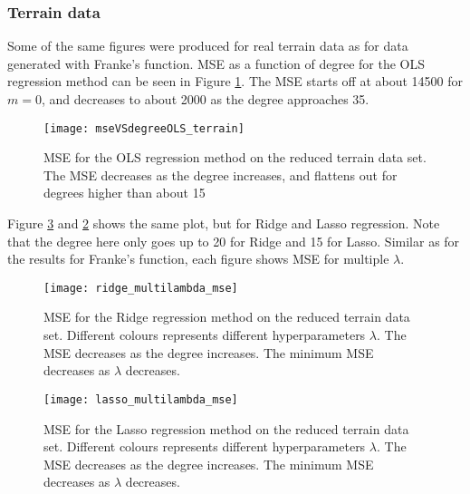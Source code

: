 \subsubsection{Terrain data}
Some of the same figures were produced for real terrain data as for data generated with Franke's function. MSE as a function of degree for the OLS regression method can be seen in Figure \ref{fig:mseVSdegreeOLSterrain}. The MSE starts off at about 14500 for $m=0$, and decreases to about 2000 as the degree approaches 35. 
\begin{figure}[htbp]
	\centering
	\texttt{[image: mseVSdegreeOLS\_terrain]}
	\caption{MSE for the OLS regression method on the reduced terrain data set. The MSE decreases as the degree increases, and flattens out for degrees higher than about 15}
	\label{fig:mseVSdegreeOLSterrain}
\end{figure}

Figure \ref{fig:mseVSdegreeRIDGEterrain} and \ref{fig:mseVSdegreeLASSOterrain} shows the same plot, but for Ridge and Lasso regression. Note that the degree here only goes up to 20 for Ridge and 15 for Lasso. Similar as for the results for Franke's function, each figure shows MSE for multiple $\lambda$. 

\begin{figure}[htbp]
	\centering
	\texttt{[image: ridge\_multilambda\_mse]}
	\caption{MSE for the Ridge regression method on the reduced terrain data set. Different colours represents different hyperparameters $\lambda$. The MSE decreases as the degree increases. The minimum MSE decreases as $\lambda$ decreases.}
	\label{fig:mseVSdegreeLASSOterrain}
\end{figure}

\begin{figure}[htbp]
	\centering
	\texttt{[image: lasso\_multilambda\_mse]}
	\caption{MSE for the Lasso regression method on the reduced terrain data set. Different colours represents different hyperparameters $\lambda$. The MSE decreases as the degree increases. The minimum MSE decreases as $\lambda$ decreases.}
	\label{fig:mseVSdegreeRIDGEterrain}
\end{figure}

\vfill
\newpage
